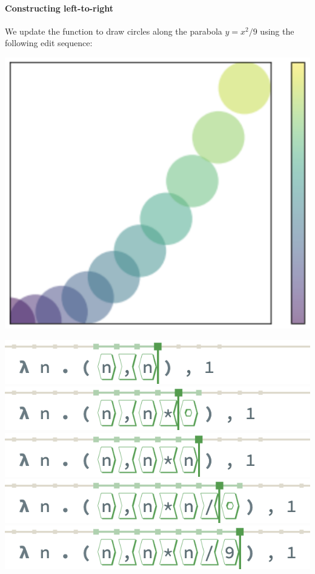 \paragraph{Constructing left-to-right}
We update the function to
draw circles along the parabola $y = x^2/9$
using the following edit sequence:

\noindent
\begin{minipage}[t]{0.2\columnwidth}
  \includegraphics[width=\textwidth]{img/circles-parabola.png}
\end{minipage}
\hfill
\begin{minipage}{0.65\columnwidth}
  \includegraphics[width=\textwidth]{img/linear-insertion-0.png}
  \includegraphics[width=\textwidth]{img/linear-insertion-1.png}
  \includegraphics[width=\textwidth]{img/linear-insertion-2.png}
  \includegraphics[width=\textwidth]{img/linear-insertion-3.png}
  \includegraphics[width=\textwidth]{img/linear-insertion-4.png}
\end{minipage}

